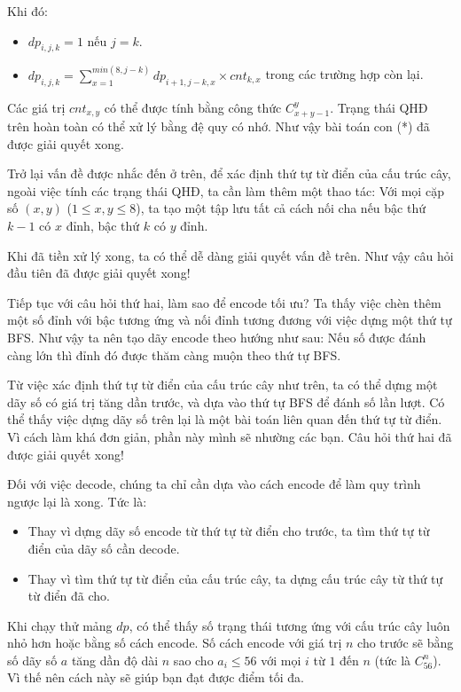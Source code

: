 Khi đó:
\begin{itemize}
   \item $dp_{i,j,k}=1$ nếu $j=k$.
   \item $dp_{i,j,k}=\sum_{x=1}^{min(8,j-k)} dp_{i+1,j-k,x}\times cnt_{k,x}$ trong các trường hợp còn lại.
\end{itemize}

Các giá trị $cnt_{x,y}$ có thể được tính bằng công thức $C^y_{x+y-1}$. Trạng thái QHĐ trên hoàn toàn có thể xử lý bằng đệ quy có nhớ. Như vậy bài toán con (*) đã được giải quyết xong.

Trở lại vấn đề được nhắc đến ở trên, để xác định thứ tự từ điển của cấu trúc cây, ngoài việc tính các trạng thái QHĐ, ta cần làm thêm một thao tác: Với mọi cặp số $(x,y)$ ($1\le x,y\le 8$), ta tạo một tập lưu tất cả cách nối cha nếu bậc thứ $k-1$ có $x$ đỉnh, bậc thứ $k$ có $y$ đỉnh.

Khi đã tiền xử lý xong, ta có thể dễ dàng giải quyết vấn đề trên. Như vậy câu hỏi đầu tiên đã được giải quyết xong!

Tiếp tục với câu hỏi thứ hai, làm sao để encode tối ưu? Ta thấy việc chèn thêm một số đỉnh với bậc tương ứng và nối đỉnh tương đương với việc dựng một thứ tự BFS. Như vậy ta nên tạo dãy encode theo hướng như sau: Nếu số được đánh càng lớn thì đỉnh đó được thăm càng muộn theo thứ tự BFS.

Từ việc xác định thứ tự từ điển của cấu trúc cây như trên, ta có thể dựng một dãy số có giá trị tăng dần trước, và dựa vào thứ tự BFS để đánh số lần lượt. Có thể thấy việc dựng dãy số trên lại là một bài toán liên quan đến thứ tự từ điển. Vì cách làm khá đơn giản, phần này mình sẽ nhường các bạn. Câu hỏi thứ hai đã được giải quyết xong!

Đối với việc decode, chúng ta chỉ cần dựa vào cách encode để làm quy trình ngược lại là xong. Tức là:
\begin{itemize}
   \item Thay vì dựng dãy số encode từ thứ tự từ điển cho trước, ta tìm thứ tự từ điển của dãy số cần decode.
   \item Thay vì tìm thứ tự từ điển của cấu trúc cây, ta dựng cấu trúc cây từ thứ tự từ điển đã cho.
\end{itemize}

Khi chạy thử mảng $dp$, có thể thấy số trạng thái tương ứng với cấu trúc cây luôn nhỏ hơn hoặc bằng số cách encode. Số cách encode với giá trị $n$ cho trước sẽ bằng số dãy số $a$ tăng dần độ dài $n$ sao cho $a_i\le 56$ với mọi $i$ từ $1$ đến $n$ (tức là $C_{56}^n$). Vì thế nên cách này sẽ giúp bạn đạt được điểm tối đa.